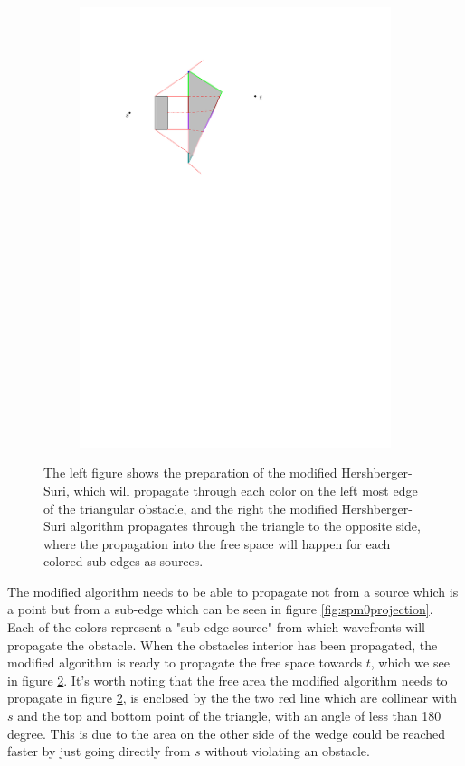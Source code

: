 \begin{figure}[H]
\begin{subfigure}{.5\textwidth}
  \includegraphics[width=.95\linewidth]{figures/spm1.pdf}
  \caption{}
  \label{fig:spm1}
\end{subfigure}
\caption{The left figure shows the preparation of the modified Hershberger-Suri, which will propagate 
         through each color on the left most edge of the triangular obstacle, and the right the modified 
         Hershberger-Suri algorithm propagates through the triangle to the opposite side, where the 
         propagation into the free space will happen for each colored sub-edges as sources.}
\end{figure}

The modified algorithm needs to be able to propagate not from a source which is a point but 
from a sub-edge which can be seen in figure \ref{fig:spm0projection}. Each of the colors 
represent a "sub-edge-source" from which wavefronts will propagate the obstacle. When the 
obstacles interior has been propagated, the modified algorithm is ready to propagate the free 
space towards $t$, which we see in figure \ref{fig:spm1}. It's worth noting that the free area 
the modified algorithm needs to propagate in figure \ref{fig:spm1}, is enclosed by the the two 
red line which are collinear with $s$ and the top and bottom point of the triangle, with an 
angle of less than 180 degree. This is due to the area on the other side of the wedge could be 
reached faster by just going directly from $s$ without violating an obstacle.

